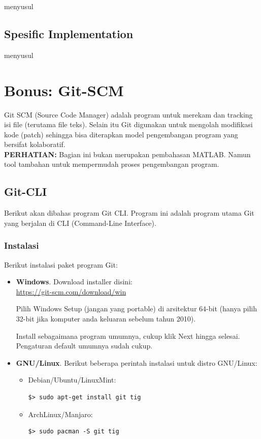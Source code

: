 \documentclass[12pt]{book}
\begin{document}
	menyusul
	
	\section{Spesific Implementation}
	
	menyusul
	
	\chapter{Bonus: Git-SCM}
	
	Git SCM (Source Code Manager) adalah program untuk merekam dan tracking isi file (terutama file teks).
	Selain itu Git digunakan untuk mengolah modifikasi kode (patch) sehingga bisa diterapkan
	model pengembangan program yang bersifat kolaboratif.\\
	
	\textbf{PERHATIAN:} Bagian ini bukan merupakan pembahasan MATLAB.
	Namun tool tambahan untuk mempermudah proses pengembangan program.
	
	\section{Git-CLI}
	
	Berikut akan dibahas program Git CLI.
	Program ini adalah program utama Git yang berjalan di CLI (Command-Line Interface).
	
	\subsection{Instalasi}
	
	Berikut instalasi paket program Git:
	\begin{itemize}
		\item \textbf{Windows}. Download installer disini:\\
		\url{https://git-scm.com/download/win}
		
		Pilih Windows Setup (jangan yang portable) di arsitektur 64-bit
		(hanya pilih 32-bit jika komputer anda keluaran sebelum tahun 2010).
		
		Install sebagaimana program umumnya, cukup klik Next hingga selesai.
		Pengaturan default umumnya sudah cukup.
		
		\item \textbf{GNU/Linux}. Berikut beberapa perintah instalasi untuk distro GNU/Linux:
		\begin{itemize}
			\item Debian/Ubuntu/LinuxMint:
			\begin{verbatim}
$> sudo apt-get install git tig
			\end{verbatim}
		
			\item ArchLinux/Manjaro:
			\begin{verbatim}
$> sudo pacman -S git tig
			\end{verbatim}
		\end{itemize}
	\end{itemize}
\end{document}
